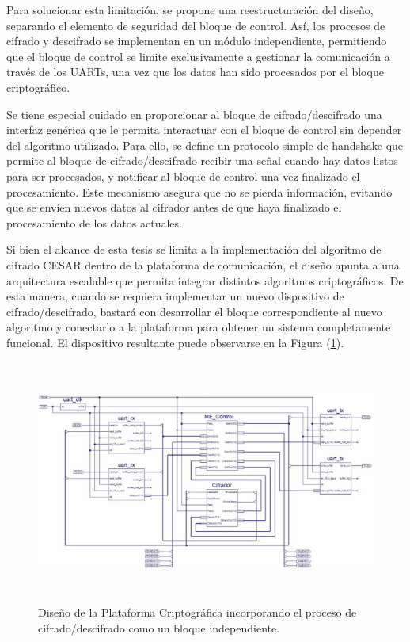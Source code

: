 Para solucionar esta limitación, se propone una reestructuración del diseño, separando el elemento de seguridad del bloque de control. Así, los procesos de cifrado y descifrado se implementan en un módulo independiente, permitiendo que el bloque de control se limite exclusivamente a gestionar la comunicación a través de los UARTs, una vez que los datos han sido procesados por el bloque criptográfico.

Se tiene especial cuidado en proporcionar al bloque de cifrado/descifrado una interfaz genérica que le permita interactuar con el bloque de control sin depender del algoritmo utilizado. Para ello, se define un protocolo simple de handshake que permite al bloque de cifrado/descifrado recibir una señal cuando hay datos listos para ser procesados, y notificar al bloque de control una vez finalizado el procesamiento. Este mecanismo asegura que no se pierda información, evitando que se envíen nuevos datos al cifrador antes de que haya finalizado el procesamiento de los datos actuales.

Si bien el alcance de esta tesis se limita a la implementación del algoritmo de cifrado CESAR dentro de la plataforma de comunicación, el diseño apunta a una arquitectura escalable que permita integrar distintos algoritmos criptográficos. De esta manera, cuando se requiera implementar un nuevo dispositivo de cifrado/descifrado, bastará con desarrollar el bloque correspondiente al nuevo algoritmo y conectarlo a la plataforma para obtener un sistema completamente funcional. El dispositivo resultante puede observarse en la Figura (\ref{fig:imagen7}).

\begin{figure}[h!] %
    \centering %
     \includegraphics[width=1\textwidth, height=8cm]{imagenes/img7} %
    \caption{ Diseño de la Plataforma Criptográfica incorporando el proceso de cifrado/descifrado 
como un bloque independiente.}
    \label{fig:imagen7} %
\end{figure} 


